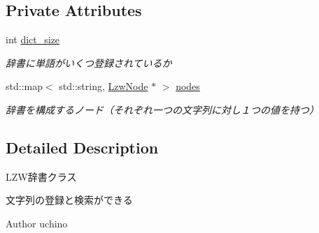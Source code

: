 \subsection*{Private Attributes}
\begin{DoxyCompactItemize}
\item 
int \hyperlink{classprdc__lzw_1_1Dictionary_ac96b4db6d4692ba9b082fe32e54bcf0d}{dict\-\_\-size}
\begin{DoxyCompactList}\small\item\em 辞書に単語がいくつ登録されているか \end{DoxyCompactList}\item 
std\-::map$<$ std\-::string, \hyperlink{classprdc__lzw_1_1LzwNode}{Lzw\-Node} $\ast$ $>$ \hyperlink{classprdc__lzw_1_1Dictionary_af204400d56e05c8a3fcc25bfd0990ff9}{nodes}
\begin{DoxyCompactList}\small\item\em 辞書を構成するノード（それぞれ一つの文字列に対し１つの値を持つ） \end{DoxyCompactList}\end{DoxyCompactItemize}


\subsection{Detailed Description}
L\-Z\-W辞書クラス 

文字列の登録と検索ができる \begin{DoxyAuthor}{Author}
uchino 
\end{DoxyAuthor}


